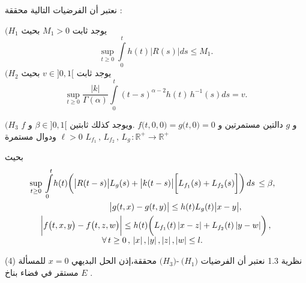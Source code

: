 \documentclass[dvipsnames,mathserif]{beamer}
\begin{document}
\begin{frame}
\begin{tcolorbox}[enhanced,colback=yellow!10!white,boxrule=0pt,frame hidden,
borderline north={1mm}{-2mm}{red},
borderline south={1mm}{-2mm}{blue},
borderline west={1mm}{-2mm}{green},
borderline east={1mm}{-2mm}{yellow}]
{\LARGE{}}
نعتبر أن الفرضيات التالية محققة :

{\large{$\big(H_1$}}
يوجد ثابت 
$M_1 >0$
بحيث
$$\sup\limits_{t\ge 0}{\displaystyle\int\limits_{0}^{t}} h(t) \big|R(s)\big|ds \le M_1.$$
{\large{$\big(H_2$}}
يوجد ثابت 
$v\in \big]0,1\big[$
بحيث 
$$\mathop {\sup }\limits_{t \ge 0} \dfrac{{\big| k \big|}}{{\Gamma (\alpha )}}{\displaystyle\int\limits_0^t} {{{(t - s)}^{\alpha  - 2}}} h(t)\,{h^{ - 1}}(s)ds = v.$$
\end{tcolorbox}
\end{frame}
\begin{frame}
\begin{tcolorbox}[enhanced,colback=yellow!10!white,boxrule=0pt,frame hidden,
borderline north={1mm}{-2mm}{red},
borderline south={1mm}{-2mm}{blue},
borderline west={1mm}{-2mm}{green},
borderline east={1mm}{-2mm}{yellow}]
{\large{$(H_3$}}
$f$
و
$g$
دالتين مستمرتين و 
$f\big(t,0,0\big)=g\big(t,0\big)=0$
.ويوجد كذلك ثابتين
$\beta\in \big]0,1\big[$
و 
$ \ell >0$
ودوال مستمرة 
${L_{{f_1}}}\,,\,{L_{{f_2}}}\,,\,{L_{g\,}}:\mathbb{R}^{+}\to\mathbb{R}^{+}$

بحيث
\begin{align*}
\hspace{-0.3cm}
\mathop {\sup }\limits_{t \ge 0} \,{\displaystyle\int\limits_0^t} {h(t)\bigg( {\big| {R(t - s)} \big|{L_g}(s) + \big| {k(t - s)} \big|\bigg[{L_{{f_1}}}(s) + {L_{{f_2}}}(s)\bigg]} \bigg)} \,ds\, \le \beta , \\
\big| {g(t,x) - g(t,y)} \big| \le h(t){L_g}(t)\big| {x - y} \big|,~~~~~~~~~~~~\\
\begin{array}{l}
\bigg| {f\big(t,x,y\big) - f\big(t,z,w\big)} \bigg| \le h(t)\bigg( {{L_{{f_1}}}(t)\left| {x - z} \right| + {L_{{f_2}}}(t)\left| {y - w} \right|} \bigg)\,,\\
\,\,\,\,\,\,\,\,\,\,\,\,~~~~~~~~~~~~~~~~\forall \,t \ge 0\,,\,\left| x \right|,\left| y \right|,\left| z \right|,\left| w \right| \le l.
\end{array}
\end{align*}
\end{tcolorbox}
\end{frame}
\begin{frame}
\begin{mybox}[colbacktitle = green]{نظرية 1.3  }
{\LARGE{}}
نعتبر أن الفرضيات
$~\big(H_1\big)$-$\big(H_3\big)$
محققة،إذن الحل البديهي 
$x=0$
للمسألة 
(4)
مستقر في فضاء بناخ 
$E$
.
\end{mybox}
\end{frame}
\end{document}
